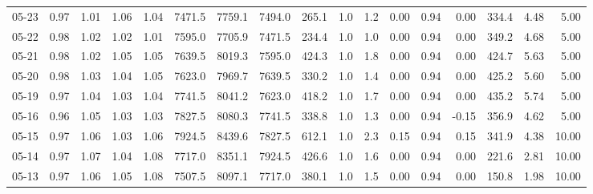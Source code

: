\begin{threeparttable}
{\begin{tabular}{lrrrrrrrrrrrrrrrr}
  05-23 &         0.97 &           1.01 &          1.06 &          1.04 & 7471.5 & 7759.1 & 7494.0 &      265.1 &                      1.0 &                 1.2 &       0.00 &      0.94 &           0.00 &            334.4 &            4.48 &                   5.00 \\
  05-22 &         0.98 &           1.02 &          1.02 &          1.01 & 7595.0 & 7705.9 & 7471.5 &      234.4 &                      1.0 &                 1.0 &       0.00 &      0.94 &           0.00 &            349.2 &            4.68 &                   5.00 \\
  05-21 &         0.98 &           1.02 &          1.05 &          1.05 & 7639.5 & 8019.3 & 7595.0 &      424.3 &                      1.0 &                 1.8 &       0.00 &      0.94 &           0.00 &            424.7 &            5.63 &                   5.00 \\
  05-20 &         0.98 &           1.03 &          1.04 &          1.05 & 7623.0 & 7969.7 & 7639.5 &      330.2 &                      1.0 &                 1.4 &       0.00 &      0.94 &           0.00 &            425.2 &            5.60 &                   5.00 \\
  05-19 &         0.97 &           1.04 &          1.03 &          1.04 & 7741.5 & 8041.2 & 7623.0 &      418.2 &                      1.0 &                 1.7 &       0.00 &      0.94 &           0.00 &            435.2 &            5.74 &                   5.00 \\
  05-16 &         0.96 &           1.05 &          1.03 &          1.03 & 7827.5 & 8080.3 & 7741.5 &      338.8 &                      1.0 &                 1.3 &       0.00 &      0.94 &          -0.15 &            356.9 &            4.62 &                   5.00 \\
  05-15 &         0.97 &           1.06 &          1.03 &          1.06 & 7924.5 & 8439.6 & 7827.5 &      612.1 &                      1.0 &                 2.3 &       0.15 &      0.94 &           0.15 &            341.9 &            4.38 &                  10.00 \\
  05-14 &         0.97 &           1.07 &          1.04 &          1.08 & 7717.0 & 8351.1 & 7924.5 &      426.6 &                      1.0 &                 1.6 &       0.00 &      0.94 &           0.00 &            221.6 &            2.81 &                  10.00 \\
  05-13 &         0.97 &           1.06 &          1.05 &          1.08 & 7507.5 & 8097.1 & 7717.0 &      380.1 &                      1.0 &                 1.5 &       0.00 &      0.94 &           0.00 &            150.8 &            1.98 &                  10.00 \\

\end{tabular}}
\end{threeparttable}
